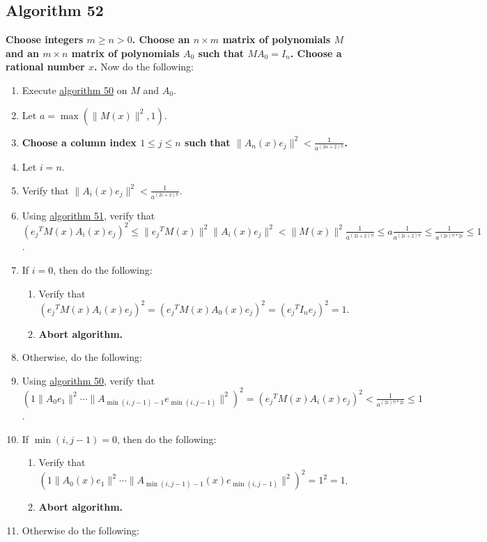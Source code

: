 \documentclass[twocolumn]{article}
\begin{document}
		\subsection{Algorithm 52}\label{sec:algorithm 52}
			\textbf{Choose integers $m\ge n>0$. Choose an $n\times m$ matrix of polynomials $M$ and an $m\times n$ matrix of polynomials $A_0$ such that $MA_0=I_n$. Choose a rational number $x$.} Now do the following:
			\begin{enumerate}
				\item Execute \hyperref[sec:algorithm 50]{algorithm 50} on $M$ and $A_0$.
				\item Let $a=\max(\lVert M(x)\rVert^2,1)$.
				\item \textbf{Choose a column index $1\le j\le n$ such that $\lVert A_n(x)e_j\rVert^2<\frac{1}{a^{(2n+2)!!}}$.}
				\item Let $i=n$.
				\item Verify that $\lVert A_i(x)e_j\rVert^2<\frac{1}{a^{(2i+2)!!}}$.
				\item Using \hyperref[sec:algorithm 51]{algorithm 51}, verify that $({e_j}^TM(x)A_i(x)e_j)^2\le\lVert{e_j}^TM(x)\rVert^2\lVert A_i(x)e_j\rVert^2<\lVert M(x)\rVert^2\frac{1}{a^{(2i+2)!!}}\le a\frac{1}{a^{(2i+2)!!}}\le\frac{1}{a^{(2i)!!*2i}}\le 1$.
				\item If $i=0$, then do the following:
				\begin{enumerate}
					\item Verify that $({e_j}^TM(x)A_i(x)e_j)^2=({e_j}^TM(x)A_0(x)e_j)^2=({e_j}^TI_ne_j)^2=1$.
					\item \textbf{Abort algorithm.}
				\end{enumerate}
				\item Otherwise, do the following:
				\item Using \hyperref[sec:algorithm 50]{algorithm 50}, verify that $(1\lVert A_0e_1\rVert^2\cdots\lVert A_{\min(i,j-1)-1}e_{\min(i,j-1)}\rVert^2)^2=({e_j}^TM(x)A_i(x)e_j)^2<\frac{1}{a^{(2i)!!*2i}}\le 1$.
				\item If $\min(i,j-1)=0$, then do the following:
				\begin{enumerate}
					\item Verify that $(1\lVert A_0(x)e_1\rVert^2\cdots\lVert A_{\min(i,j-1)-1}(x)e_{\min(i,j-1)}\rVert^2)^2=1^2=1$.
					\item \textbf{Abort algorithm.}
				\end{enumerate}
				\item Otherwise do the following:
				\begin{enumerate}

\end{enumerate}
\end{enumerate}
\end{document}
